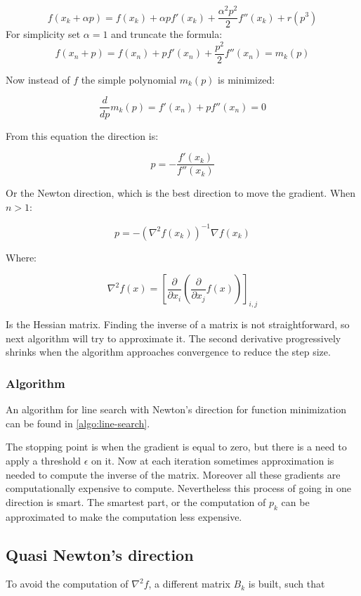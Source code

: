   $$
  f(x_k+\alpha p)=f(x_k) + \alpha p f'(x_k) + \frac{\alpha^2p^2}{2} f''(x_k) + r(p^3)
  $$
  For simplicity set $\alpha=1$ and truncate the formula:
  $$
  f(x_n+p)=f(x_n) + p f'(x_n) + \frac{p^2}{2} f''(x_n) = m_k(p)
  $$

  Now instead of $f$ the simple polynomial $m_k(p)$ is minimized:

  $$\frac{d}{dp}m_k(p) = f'(x_n) + pf''(x_n) = 0$$

  From this equation the direction is:

  $$p = -\frac{f'(x_k)}{f''(x_k)}$$

  Or the Newton direction, which is the best direction to move the gradient.
  When $n>1$:

  $$p = -(\nabla^2 f(x_k))^{-1}\nabla f(x_k)$$

  Where:

  $$\nabla^2 f(x) = \left[\frac{\partial}{\partial x_i}\left(\frac{\partial}{\partial x_j}f(x)\right)\right]_{i,j}$$

  Is the Hessian matrix.
  Finding the inverse of a matrix is not straightforward, so next algorithm will try to approximate it.
  The second derivative progressively shrinks when the algorithm approaches convergence to reduce the step size.

  \subsubsection{Algorithm}
  An algorithm for line search with Newton's direction for function minimization can be found in \ref{algo:line-search}.

  

  The stopping point is when the gradient is equal to zero, but there is a need to apply a threshold $\epsilon$ on it.
  Now at each iteration sometimes approximation is needed to compute the inverse of the matrix.
  Moreover all these gradients are computationally expensive to compute.
  Nevertheless this process of going in one direction is smart.
  The smartest part, or the computation of $p_k$ can be approximated to make the computation less expensive.


  \subsection{Quasi Newton's direction}
  To avoid the computation of $\nabla^2 f$, a different matrix $B_k$ is built, such that

